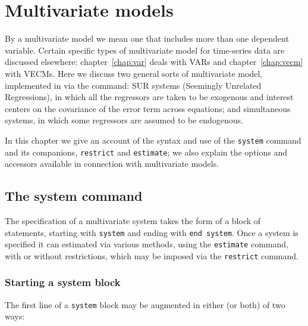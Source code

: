 \chapter{Multivariate models}
\label{chap:system}

By a multivariate model we mean one that includes more than one
dependent variable. Certain specific types of multivariate model for
time-series data are discussed elsewhere: chapter~\ref{chap:var} deals
with VARs and chapter~\ref{chap:vecm} with VECMs. Here we discuss two
general sorts of multivariate model, implemented in  via
the  command: SUR systems (Seemingly Unrelated
Regressions), in which all the regressors are taken to be exogenous
and interest centers on the covariance of the error term across
equations; and simultaneous systems, in which some regressors are
assumed to be endogenous.

In this chapter we give an account of the syntax and use of the
\texttt{system} command and its companions, \texttt{restrict}
and \texttt{estimate}; we also explain the options and accessors
available in connection with multivariate models.

\section{The system command}
\label{sec:system-regular}

The specification of a multivariate system takes the form of a block
of statements, starting with \texttt{system} and ending with
\texttt{end system}. Once a system is specified it can estimated via
various methods, using the \texttt{estimate} command, with or without
restrictions, which may be imposed via the \texttt{restrict} command.

\subsection{Starting a system block}

The first line of a \texttt{system} block may be augmented in either
(or both) of two ways:

